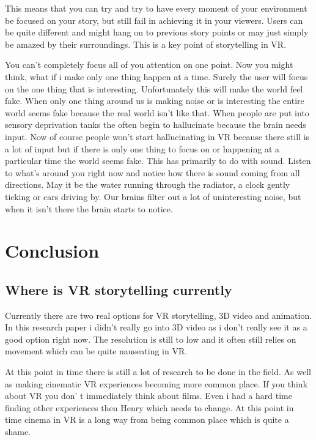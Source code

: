 \documentclass{report}
\begin{document}
				This means that you can try and try to have every moment of your environment be focused on your story, but still fail in achieving it in your viewers. Users can be quite different and might hang on to previous story points or may just simply be amazed by their surroundings. This is a key point of storytelling in VR.
				
				You can't completely focus all of you attention on one point. Now you might think, what if i make only one thing happen at a time. Surely the user will focus on the one thing that is interesting. Unfortunately this will make the world feel fake. When only one thing around us is making noise or is interesting the entire world seems fake because the real world isn't like that. When people are put into sensory deprivation tanks the often begin to hallucinate because the brain needs input. Now of course people won't start hallucinating in VR because there still is a lot of input but if there is only one thing to focus on or happening at a particular time the world seems fake. 
				This has primarily to do with sound. Listen to what's around you right now and notice how there is sound coming from all directions. May it be the water running through the radiator, a clock gently ticking or cars driving by. Our brains filter out a lot of uninteresting noise, but when it isn't there the brain starts to notice.
				
								
				\chapter{Conclusion}
				\section{Where is VR storytelling currently}
				
				Currently there are two real options for VR storytelling, 3D video and animation. In this research paper i didn't really go into 3D video as i don't really see it as a good option right now. The resolution is still to low and it often still relies on movement which can be quite nauseating in VR. 
				
				At this point in time there is still a lot of research to be done in the field. As well as making cinematic VR experiences becoming more common place. If you think about VR you don' t immediately think about films. Even i had a hard time finding other experiences then Henry which needs to change. At this point in time cinema in VR is a long way from being common place which is quite a shame.
				
\end{document}
